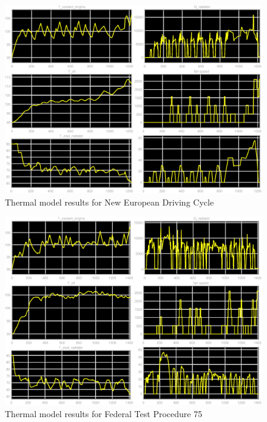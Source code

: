 \begin{figure}[ht]
  \centering
  \includegraphics[width=\textwidth]{figures/model/th_results_NEDC.eps}
  \caption{Thermal model results for New European Driving Cycle\label{fig:th_results_NEDC} }
\end{figure}

\begin{figure}[ht]
  \centering
  \includegraphics[width=\textwidth]{figures/model/th_results_FTP.eps}
  \caption{Thermal model results for Federal Test Procedure 75\label{fig:th_results_FTP} }
\end{figure}
~

